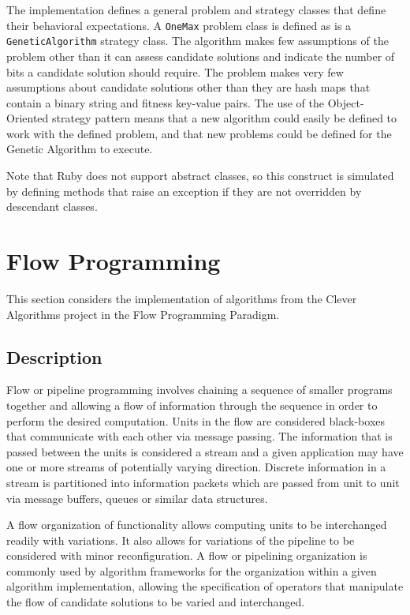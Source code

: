 \documentclass[a4paper, 11pt]{article}
\begin{document}
The implementation defines a general problem and strategy classes that define their behavioral expectations. A \texttt{OneMax} problem class is defined as is a \texttt{GeneticAlgorithm} strategy class. The algorithm makes few assumptions of the problem other than it can assess candidate solutions and indicate the number of bits a candidate solution should require. The problem makes very few assumptions about candidate solutions other than they are hash maps that contain a binary string and fitness key-value pairs. The use of the Object-Oriented strategy pattern means that a new algorithm could easily be defined to work with the defined problem, and that new problems could be defined for the Genetic Algorithm to execute.

Note that Ruby does not support abstract classes, so this construct is simulated by defining methods that raise an exception if they are not overridden by descendant classes.



\section{Flow Programming}
This section considers the implementation of algorithms from the Clever Algorithms project in the Flow Programming Paradigm.

\subsection{Description}
Flow or pipeline programming involves chaining a sequence of smaller programs together and allowing a flow of information through the sequence in order to perform the desired computation. Units in the flow are considered black-boxes that communicate with each other via message passing. The information that is passed between the units is considered a stream and a given application may have one or more streams of potentially varying direction. Discrete information in a stream is partitioned into information packets which are passed from unit to unit via message buffers, queues or similar data structures.

A flow organization of functionality allows computing units to be interchanged readily with variations. It also allows for variations of the pipeline to be considered with minor reconfiguration. A flow or pipelining organization is commonly used by algorithm frameworks for the organization within a given algorithm implementation, allowing the specification of operators that manipulate the flow of candidate solutions to be varied and interchanged.
\end{document}
